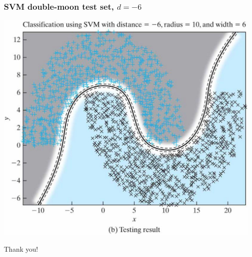 \documentclass[12pt,notes,mathserif]{beamer}
\newcommand{\chuhao}{\fontsize{44.9pt}{\baselineskip}\selectfont}
\begin{document}
\begin{frame}[c]
\frametitle{SVM double-moon test set, $d=-6$}
\begin{center}
\includegraphics[width=0.7\linewidth]{fig10/lec1111.jpg}
\end{center}
\end{frame}



\begin{frame}
\begin{center}
\chuhao Thank you! %
\end{center}
\end{frame}
\end{document}
